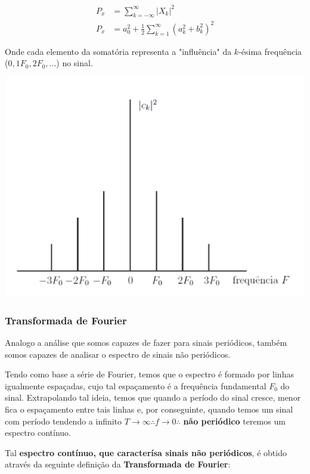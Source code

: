 \documentclass{article}
\begin{document}
\begin{minipage}{.5\textwidth}
    \begin{align}
        P_x &= \sum^\infty_{k = -\infty} |X_k|^2 \\ 
        P_x &= a_0^2 + \frac{1}{2}\sum^\infty_{k = 1} (a_k^2 + b_k^2)^2
    \end{align}

     Onde cada elemento da somatória representa a "influência" da $k$-ésima frequência ($0, 1F_0, 2F_0, ...$) no sinal.
\end{minipage}
\begin{minipage}{0.5\textwidth}
    \centering
    \includegraphics[width=0.8 \textwidth]{imgs/espectro_potencia.png}
\end{minipage}

\subsubsection{Transformada de Fourier}
Analogo a análise que somos capazes de fazer para sinais periódicos, também somos capazes de analisar o espectro de sinais não periódicos.

Tendo como base a série de Fourier, temos que o espectro é formado por linhas igualmente espaçadas, cujo tal espaçamento é a frequência fundamental $F_0$ do sinal. Extrapolando tal ideia, temos que quando a período do sinal cresce, menor fica o espaçamento entre tais linhas e, por conseguinte, quando temos um sinal com período tendendo a infinito $T \rightarrow \infty \therefore f \rightarrow 0 \therefore$ \textbf{não periódico} teremos um espectro contínuo.

Tal \textbf{espectro contínuo, que caracterísa sinais não periódicos}, é obtido através da seguinte definição da \textbf{Transformada de Fourier}:
\end{document}

